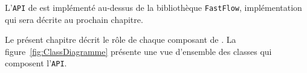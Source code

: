 L'\texttt{API} de \PpFf{} est impl\'ement\'e au-dessus de la biblioth\`eque \texttt{FastFlow}, impl\'ementation qui sera d\'ecrite au prochain chapitre.

Le pr\'esent chapitre d\'ecrit le r\^ole de chaque composant de
\PpFf{}. La figure~\ref{fig:ClassDiagramme} pr\'esente une vue
d'ensemble des classes qui composent l'\texttt{API}.


%
%
%
%


%

